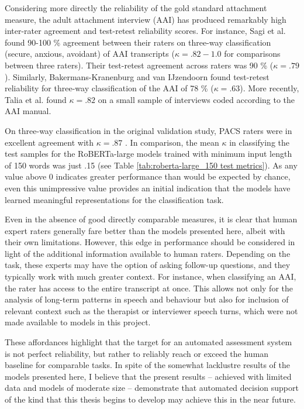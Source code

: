 \documentclass[12pt]{report}
\begin{document}
Considering more directly the reliability of the gold standard attachment measure, the adult attachment interview (AAI) has produced remarkably high inter-rater agreement and test-retest reliability scores.
For instance, Sagi et al. \citeyear{Sagi1994} found 90-100 \% agreement between their raters on three-way classification (secure, anxious, avoidant) of AAI transcripts ($\kappa = .82 - 1.0$ for comparisons between three raters). Their test-retest agreement across raters was 90 \% ($\kappa = .79$).
Similarly, Bakermans-Kranenburg and van IJzendoorn \citeyear{BakermansKranenburg1993} found test-retest reliability for three-way classification of the AAI of 78 \% ($\kappa = .63$).
More recently, Talia et al. \citeyear{Talia2020} found $\kappa = .82$ on a small sample of interviews coded according to the AAI manual.

On three-way classification in the original validation study, PACS raters were in excellent agreement with $\kappa = .87$ \cite{Talia2017}.
In comparison, the mean $\kappa$ in classifying the test samples for the RoBERTa-large models trained with minimum input length of 150 words was just .15 (see Table \ref{tab:roberta-large_150 test metrics}).
As any value above 0 indicates greater performance than would be expected by chance, even this unimpressive value provides an initial indication that the models have learned meaningful representations for the classification task.

Even in the absence of good directly comparable measures, it is clear that human expert raters generally fare better than the models presented here, albeit with their own limitations.
However, this edge in performance should be considered in light of the additional information available to human raters.
Depending on the task, these experts may have the option of asking follow-up questions, and they typically work with much greater context.
For instance, when classifying an AAI, the rater has access to the entire transcript at once.
This allows not only for the analysis of long-term patterns in speech and behaviour but also for inclusion of relevant context such as the therapist or interviewer speech turns, which were not made available to models in this project.

These affordances highlight that the target for an automated assessment system is not perfect reliability, but rather to reliably reach or exceed the human baseline for comparable tasks.
In spite of the somewhat lacklustre results of the models presented here, I believe that the present results -- achieved with limited data and models of moderate size -- demonstrate that automated decision support of the kind that this thesis begins to develop may achieve this in the near future.
\end{document}
